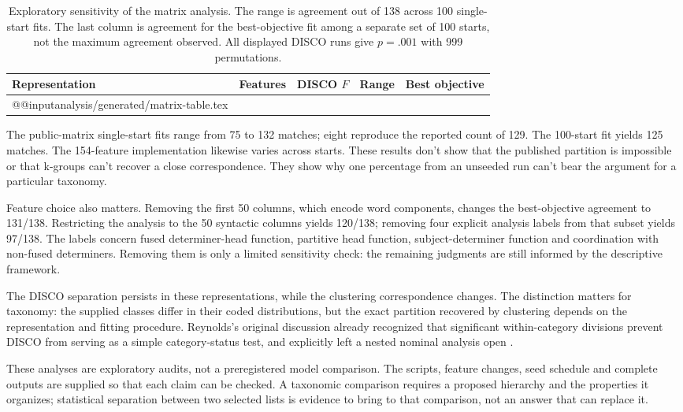 \documentclass[12pt]{article}
\makeatletter
\newcommand{\tablebody}[1]{\csname @@input\endcsname #1 }
\makeatother
\begin{document}
\begin{table}[tb]
\centering\small
\caption{Exploratory sensitivity of the matrix analysis. The range is agreement out of 138 across 100 single-start fits. The last column is agreement for the best-objective fit among a separate set of 100 starts, not the maximum agreement observed. All displayed DISCO runs give $p=.001$ with 999 permutations.}\label{tab:matrix}
\begin{tabular}{>{\raggedright\arraybackslash}p{5.1cm}rrrr}
\toprule
Representation & Features & DISCO $F$ & Range & Best objective \\
\midrule
\tablebody{analysis/generated/matrix-table.tex}
\bottomrule
\end{tabular}
\end{table}

The public-matrix single-start fits range from 75 to 132 matches; eight reproduce the reported count of 129. The 100-start fit yields 125 matches. The 154-feature implementation likewise varies across starts. These results don't show that the published partition is impossible or that k-groups can't recover a close correspondence. They show why one percentage from an unseeded run can't bear the argument for a particular taxonomy.

Feature choice also matters. Removing the first 50 columns, which encode word components, changes the best-objective agreement to 131/138. Restricting the analysis to the 50 syntactic columns yields 120/138; removing four explicit analysis labels from that subset yields 97/138. The labels concern fused determiner-head function, partitive head function, subject-determiner function and coordination with non-fused determiners. Removing them is only a limited sensitivity check: the remaining judgments are still informed by the descriptive framework.

The DISCO separation persists in these representations, while the clustering correspondence changes. The distinction matters for taxonomy: the supplied classes differ in their coded distributions, but the exact partition recovered by clustering depends on the representation and fitting procedure. Reynolds's original discussion already recognized that significant within-category divisions prevent DISCO from serving as a simple category-status test, and explicitly left a nested nominal analysis open \citep{reynolds2021}.

These analyses are exploratory audits, not a preregistered model comparison. The scripts, feature changes, seed schedule and complete outputs are supplied so that each claim can be checked. A taxonomic comparison requires a proposed hierarchy and the properties it organizes; statistical separation between two selected lists is evidence to bring to that comparison, not an answer that can replace it.
\end{document}
